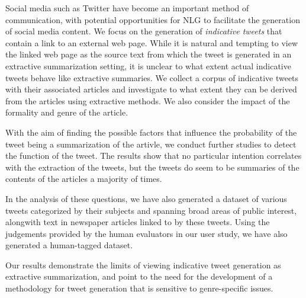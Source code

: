 Social media such as Twitter have become an important method of communication, with potential opportunities for NLG to facilitate the generation of social media content. We focus on the generation of \emph{indicative tweets} that contain a link to an external web page. While it is natural and tempting to view the linked web page as the source text from which the tweet is generated in an extractive summarization setting, it is unclear to what extent actual indicative tweets behave like extractive summaries. We collect a corpus of indicative tweets with their associated articles and investigate to what extent they can be derived from the articles using extractive methods. We also consider the impact of the formality and genre of the article.

With the aim of finding the possible factors that influence the probability of the tweet being a summarization of the artivle, we conduct further studies to detect the function of the tweet. The results show that no particular intention correlates with the extraction of the tweets, but the tweets do seem to be summaries of the contents of the articles a majority of times. 

In the analysis of these questions, we have also generated a dataset of various tweets categorized by their subjects and  spanning broad areas of public interest, alongwith text in newspaper articles linked to by these tweets. Using the judgements provided by the human evaluators in our user study, we have also generated a human-tagged dataset.

Our results demonstrate the limits of viewing indicative tweet generation as extractive summarization, and point to the need for the development of a methodology for tweet generation that is sensitive to genre-specific issues.